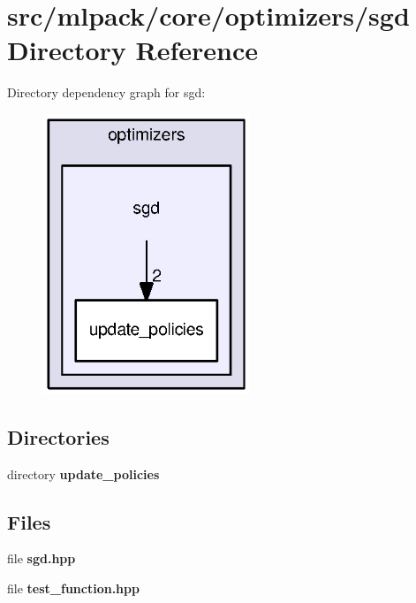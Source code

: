 \section{src/mlpack/core/optimizers/sgd Directory Reference}
\label{dir_1bfd5596fecf22290211be250d517d41}
Directory dependency graph for sgd\+:
\nopagebreak
\begin{figure}[H]
\begin{center}
\leavevmode
\includegraphics[width=176pt]{dir_1bfd5596fecf22290211be250d517d41_dep}
\end{center}
\end{figure}
\subsection*{Directories}
\begin{DoxyCompactItemize}
\item 
directory {\bf update\+\_\+policies}
\end{DoxyCompactItemize}
\subsection*{Files}
\begin{DoxyCompactItemize}
\item 
file {\bf sgd.\+hpp}
\item 
file {\bf test\+\_\+function.\+hpp}
\end{DoxyCompactItemize}

